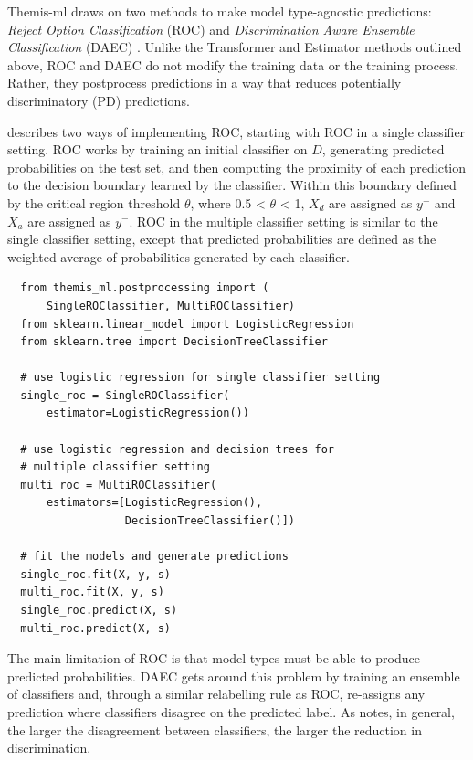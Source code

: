 \documentclass{interact}
\begin{document}
Themis-ml draws on two methods to make model type-agnostic predictions:
\emph{Reject Option Classification} (ROC) and \emph{Discrimination Aware
Ensemble Classification} (DAEC) \cite{kamiran2012decision}. Unlike the
Transformer and Estimator methods outlined above, ROC and DAEC do not modify the
training data or the training process. Rather, they postprocess predictions in a
way that reduces potentially discriminatory (PD) predictions.

\cite{kamiran2012decision} describes two ways of implementing ROC, starting with
ROC in a single classifier setting. ROC works by training an initial classifier
on \(D\), generating predicted probabilities on the test set, and then computing the
proximity of each prediction to the decision boundary learned by the classifier.
Within this boundary defined by the critical region threshold \(\theta\), where
0.5 < \(\theta\) < 1, \(X_d\) are assigned as \(y^{+}\) and \(X_a\) are assigned
as \(y^{-}\). ROC in the multiple classifier setting is similar to the single
classifier setting, except that predicted probabilities are defined as the
weighted average of probabilities generated by each classifier.

\begin{verbatim}
  from themis_ml.postprocessing import (
      SingleROClassifier, MultiROClassifier)
  from sklearn.linear_model import LogisticRegression
  from sklearn.tree import DecisionTreeClassifier

  # use logistic regression for single classifier setting
  single_roc = SingleROClassifier(
      estimator=LogisticRegression())

  # use logistic regression and decision trees for
  # multiple classifier setting
  multi_roc = MultiROClassifier(
      estimators=[LogisticRegression(),
                  DecisionTreeClassifier()])

  # fit the models and generate predictions
  single_roc.fit(X, y, s)
  multi_roc.fit(X, y, s)
  single_roc.predict(X, s)
  multi_roc.predict(X, s)
\end{verbatim}

The main limitation of ROC is that model types must be able to produce predicted
probabilities. DAEC gets around this problem by training an ensemble of
classifiers and, through a similar relabelling rule as ROC, re-assigns any
prediction where classifiers disagree on the predicted label. As
\cite{kamiran2012decision} notes, in general, the larger the disagreement
between classifiers, the larger the reduction in discrimination.
\end{document}
